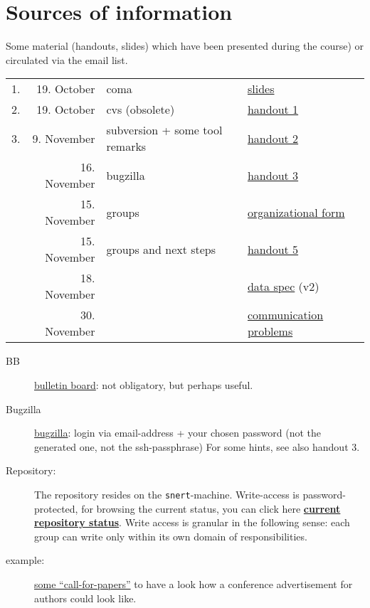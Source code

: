
\section*{Sources of information}


Some material (handouts, slides) which have been presented during the
course) or circulated via the email list.



\begin{tabular}{r@{\quad\quad}rll}
  \hline
  1. & 19. October & coma  & 
  \href{slides/main-coma.pdf}{slides}
  \\
  2. & 19. October & cvs (obsolete) & \href{handouts/handout1.pdf}{handout 1}
  \\
  3. & 9. November & subversion + some tool remarks &
  \href{handouts/handout2.pdf}{handout 2}
  \\
   & 16. November & bugzilla &
  \href{handouts/handout3.pdf}{handout 3}
  \\
   & 15. November & groups &
  \href{handouts/handout4.pdf}{organizational form}
  \\
   & 15. November & groups and next steps &
  \href{handouts/handout5.pdf}{handout 5}
  \\\hline 
   & 18. November &  &
  \href{spec/v2/main.pdf}{data spec} (v2)
  \\\hline 
   & 30. November &  &
  \href{handouts/handout6.pdf}{communication problems}
  \\
\end{tabular}




\begin{description}
\item[BB]
  \href{http://snert.informatik.uni-kiel.de:8080/~swprakt/phpBB2/}{bulletin
    board}: not obligatory, but perhaps useful.
\item[Bugzilla] 
  \href{http://snert.informatik.uni-kiel.de:8080/~swprakt/bugzilla}{bugzilla}: 
  login via email-address + your chosen password (not the generated one, not the ssh-passphrase)
  For some hints, see also handout 3.
\item[Repository:] The repository resides on the \texttt{snert}-machine.
  Write-access is password-protected, for browsing the current status, you
  can click here
  \href{http://snert.informatik.uni-kiel.de:8080/svn/coma/}{\textbf{current
      repository status}}. Write access is granular in the following sense:
  each group can write only within its own domain of responsibilities.
\item[example:] \href{requirements/examples/cfpapers.html}{some
    ``call-for-papers''} to have a look how a conference advertisement for
  authors could look like.
\end{description}





